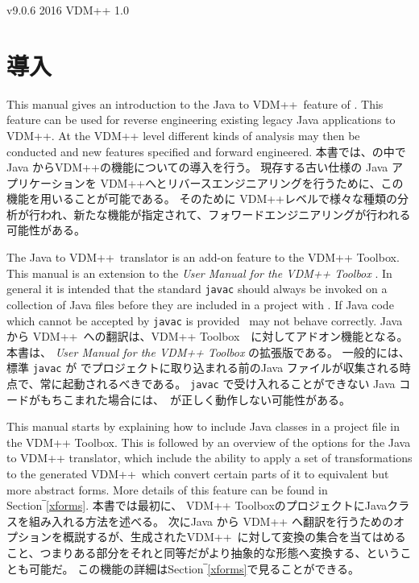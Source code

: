 \documentclass[\pformat,12pt]{jarticle}
\newcommand{\vdmslpp}{VDM++}
\newcommand{\ToolboxName}{VDM++ Toolbox}
\newcommand{\vdmtoolsver}{v9.0.6}
\begin{document}
\vdmtoolsmanualcsk{Java → \vdmslpp\ ユーザマニュアル}
       {\vdmtoolsver}
       {2016}
       {\vdmslpp}
       {1.0}
 

\section{導入} \label{sec:introduction}

This manual gives an introduction to the Java to \vdmslpp\ feature
of \VDMTools. This feature can be used for reverse
engineering existing legacy Java applications to VDM++. At the VDM++
level different kinds of analysis may then be conducted and new
features specified and forward engineered.
本書では、\VDMTools の中で Java から\vdmslpp の機能についての導入を行う。
現存する古い仕様の Java アプリケーションを VDM++へとリバースエンジニアリングを行うために、この機能を用いることが可能である。
そのために VDM++レベルで様々な種類の分析が行われ、新たな機能が指定されて、フォワードエンジニアリングが行われる可能性がある。

The Java to \vdmslpp\ translator is an add-on feature to the
\ToolboxName{}. This manual is an extension to the {\em User Manual
  for the VDM++ Toolbox} \cite{UserManPP-CSK}. In general it is
intended that the standard \texttt{javac} should always be invoked on
a collection of Java files 
before they are included in a project with \VDMTools. If Java code
which cannot be accepted by \texttt{javac} is provided \VDMTools\ may
not behave correctly.
 Java から \vdmslpp\ への翻訳は、\ToolboxName{}　に対してアドオン機能となる。
本書は、 {\em User Manual for the VDM++ Toolbox} \cite{UserManPP-CSK}の拡張版である。
一般的には、標準 \texttt{javac} が \VDMTools でプロジェクトに取り込まれる前のJava ファイルが収集される時点で、常に起動されるべきである。
 \texttt{javac} で受け入れることができない Java コードがもちこまれた場合には、\VDMTools\ が正しく動作しない可能性がある。

This manual starts by explaining how to include Java classes in a
project file in the \ToolboxName{}. This is followed by an overview of the
options for the Java to VDM++ translator, which include the ability to
apply a set of transformations to the generated \vdmslpp\ which
convert certain parts of it to equivalent but more abstract
forms. More details of this feature can be found in Section‾\ref{xforms}.
本書では最初に、 \ToolboxName{}のプロジェクトにJavaクラスを組み入れる方法を述べる。
次にJava から VDM++ へ翻訳を行うためのオプションを概説するが、生成された\vdmslpp\ に対して変換の集合を当てはめること、つまりある部分をそれと同等だがより抽象的な形態へ変換する、ということも可能だ。
この機能の詳細はSection‾\ref{xforms}で見ることができる。
\end{document}
